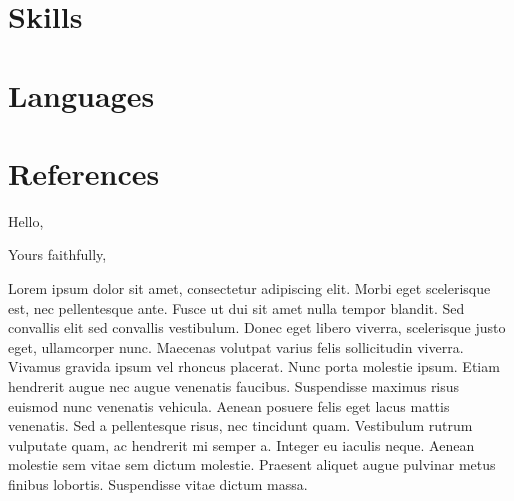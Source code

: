 \documentclass[11pt,a4paper,sans]{moderncv}
\begin{document}
\section{Skills}

\section{Languages}

\section{References}

\clearpage


\date{\today}
\opening{Hello,}
\closing{Yours faithfully,}
\makelettertitle


Lorem ipsum dolor sit amet, consectetur adipiscing elit. Morbi eget scelerisque
est, nec pellentesque ante. Fusce ut dui sit amet nulla tempor blandit. Sed
convallis elit sed convallis vestibulum. Donec eget libero viverra, scelerisque
justo eget, ullamcorper nunc. Maecenas volutpat varius felis sollicitudin
viverra. Vivamus gravida ipsum vel rhoncus placerat. Nunc porta molestie ipsum.
Etiam hendrerit augue nec augue venenatis faucibus. Suspendisse maximus risus
euismod nunc venenatis vehicula. Aenean posuere felis eget lacus mattis
venenatis. Sed a pellentesque risus, nec tincidunt quam. Vestibulum rutrum
vulputate quam, ac hendrerit mi semper a. Integer eu iaculis neque. Aenean
molestie sem vitae sem dictum molestie. Praesent aliquet augue pulvinar metus
finibus lobortis. Suspendisse vitae dictum massa.
\end{document}
